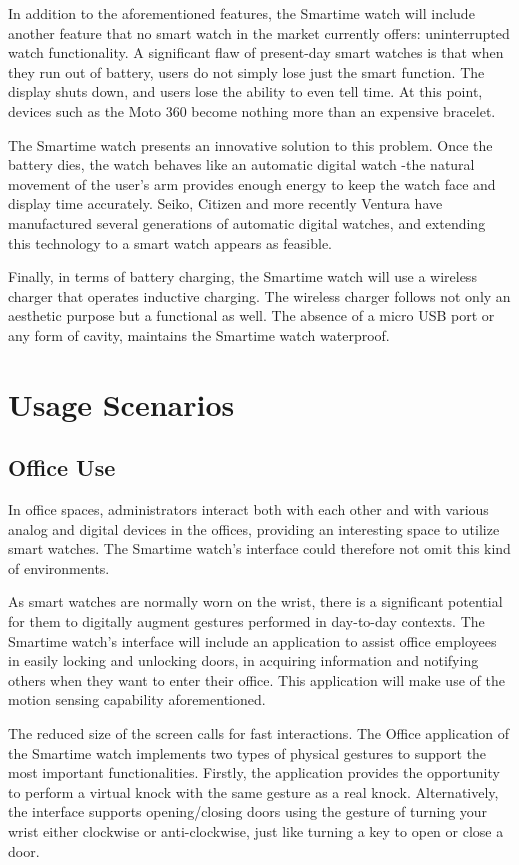 \documentclass{article}
\begin{document}
In addition to the aforementioned features, the Smartime watch will include another feature that no smart watch in the market currently offers: uninterrupted watch functionality. A significant flaw of present-day smart watches is that when they run out of battery, users do not simply lose just the smart function. The display shuts down, and users lose the ability to even tell time. At this point, devices such as the Moto 360 become nothing more than an expensive bracelet. 

The Smartime watch presents an innovative solution to this problem. Once the battery dies, the watch behaves like an automatic digital watch -the natural movement of the user's arm provides enough energy to keep the watch face and display time accurately. Seiko, Citizen and more recently Ventura have manufactured several generations of automatic digital watches, and extending this technology to a smart watch appears as feasible.

Finally, in terms of battery charging, the Smartime watch will use a wireless charger that operates inductive charging. The wireless charger follows not only an aesthetic purpose but a functional as well. The absence of a micro USB port or any form of cavity, maintains the Smartime watch waterproof. 

\section{Usage Scenarios}
\subsection{Office Use}
In office spaces, administrators interact both with each other and with various analog and digital devices in the offices, providing an interesting space to utilize smart watches.  The Smartime watch's interface could therefore not omit this kind of environments.

As smart watches are normally worn on the wrist, there is a significant potential for them to digitally augment gestures performed in day-to-day contexts. The Smartime watch's interface will include an application to assist office employees in easily locking and unlocking doors, in acquiring information and notifying others when they want to enter their office. This application will make use of the motion sensing capability aforementioned. 

The reduced size of the screen calls for fast interactions. The Office application of the Smartime watch implements two types of physical gestures to support the most important functionalities. Firstly, the application provides the opportunity to perform a virtual knock with the same gesture as a real knock.  Alternatively, the interface supports opening/closing doors using the gesture of turning your wrist either clockwise or anti-clockwise, just like turning a key to open or close a door. 
\end{document}
